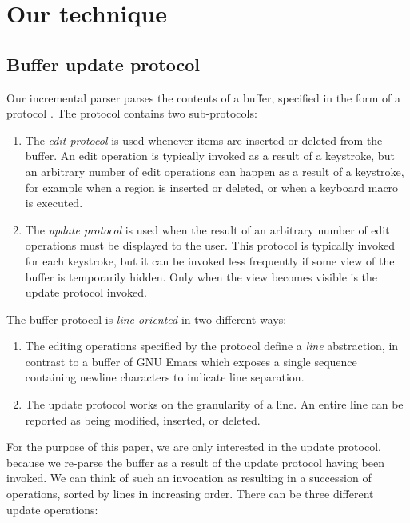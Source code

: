 \section{Our technique}

\subsection{Buffer update protocol}

Our incremental parser parses the contents of a buffer, specified in
the form of a \clos{} protocol
\cite{Strandh:2016:CPE:3005729.3005732}.  The protocol contains two
sub-protocols:

\begin{enumerate}
\item The \emph{edit protocol} is used whenever items are inserted or
  deleted from the buffer.  An edit operation is typically invoked as
  a result of a keystroke, but an arbitrary number of edit operations
  can happen as a result of a keystroke, for example when a region is
  inserted or deleted, or when a keyboard macro is executed.
\item The \emph{update protocol} is used when the result of an
  arbitrary number of edit operations must be displayed to the user.
  This protocol is typically invoked for each keystroke, but it can be
  invoked less frequently if some view of the buffer is temporarily
  hidden.  Only when the view becomes visible is the update protocol
  invoked.
\end{enumerate}

The buffer protocol is \emph{line-oriented} in two different ways:

\begin{enumerate}
\item The editing operations specified by the protocol define a
  \emph{line} abstraction, in contrast to a buffer of GNU Emacs
  \cite{Finseth:1980:TPTa} which exposes a single sequence containing
  newline characters to indicate line separation.
\item The update protocol works on the granularity of a line.  An
  entire line can be reported as being modified, inserted, or
  deleted.
\end{enumerate}

For the purpose of this paper, we are only interested in the update
protocol, because we re-parse the buffer as a result of the update
protocol having been invoked.  We can think of such an invocation as
resulting in a succession of operations, sorted by lines in increasing
order.  There can be three different update operations:

